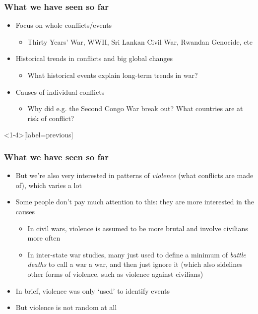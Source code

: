 \documentclass[utf8, xcolor=dvipsnames, handout]{beamer}
\begin{document}
\begin{frame}
\frametitle{What we have seen so far}
\centering

\begin{itemize}
  \item<1-> Focus on whole conflicts/events
  \begin{itemize}
    \item Thirty Years' War, WWII, Sri Lankan Civil War, Rwandan Genocide, etc
  \end{itemize}
  \item<2-> Historical trends in conflicts and big global changes
  \begin{itemize}
    \item What historical events explain long-term trends in war?
  \end{itemize}
  \item<3-> Causes of individual conflicts
  \begin{itemize}
    \item Why did e.g. the Second Congo War break out? What countries are at risk of conflict?
  \end{itemize}
\end{itemize}

\end{frame}

\begin{frame}<1-4>[label=previous]
\frametitle{What we have seen so far}
\centering

\begin{itemize}[<+->]
  \item But we're also very interested in patterns of \textit{violence} (what conflicts are made of), which varies a lot
  \item Some people don't pay much attention to this: they are more interested in the causes
  \begin{itemize}
    \item In civil wars, violence is assumed to be more brutal and involve civilians more often
    \item In inter-state war studies, many just used to define a minimum of \textit{battle deaths} to call a war a war, and then just ignore it (which also sidelines other forms of violence, such as violence against civilians)
  \end{itemize}
  \item In brief, violence was only `used' to identify events
  \item But violence is not random at all
\end{itemize}

\end{frame}
\end{document}
